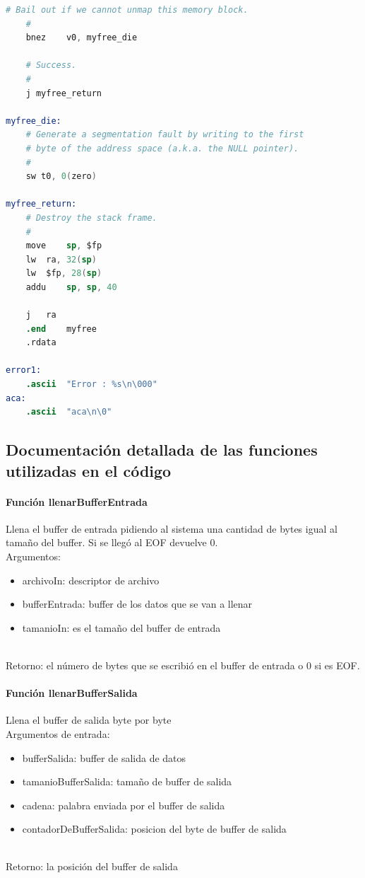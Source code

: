 \documentclass[a4paper]{article}
\begin{document}
\begin{lstlisting}[language=Assembler]
	# Bail out if we cannot unmap this memory block.
	#
	bnez	v0, myfree_die

	# Success.
	#
	j myfree_return

myfree_die:
	# Generate a segmentation fault by writing to the first
	# byte of the address space (a.k.a. the NULL pointer).
	#
	sw t0, 0(zero)

myfree_return:
	# Destroy the stack frame.
	#
	move	sp, $fp
	lw	ra, 32(sp)
	lw	$fp, 28(sp)
	addu	sp, sp, 40

	j	ra
	.end	myfree
	.rdata

error1:
	.ascii	"Error : %s\n\000"
aca:
	.ascii	"aca\n\0"

\end{lstlisting}

\subsection{Documentación detallada de las funciones utilizadas en el código}
\paragraph{Función llenarBufferEntrada}
Llena el buffer de entrada pidiendo al sistema una cantidad de bytes igual al tamaño del buffer. Si se llegó al EOF devuelve 0. \\
Argumentos:
	\begin{itemize}
	\item archivoIn:	descriptor de archivo
	\item bufferEntrada:	buffer de los datos que se van a llenar
	\item tamanioIn:	es el tamaño del buffer de entrada
\end{itemize} \\
Retorno: el número de bytes que se escribió en el buffer de entrada o 0 si es EOF. 


\paragraph{Función llenarBufferSalida}
Llena el buffer de salida byte por byte \\
Argumentos de entrada:
\begin{itemize}
	\item bufferSalida:	buffer de salida de datos
	\item tamanioBufferSalida: tamaño de buffer de salida
	\item cadena: palabra enviada por el buffer de salida
	\item contadorDeBufferSalida: posicion del byte de buffer de salida
\end{itemize} \\
Retorno: la posición del buffer de salida
\end{document}
